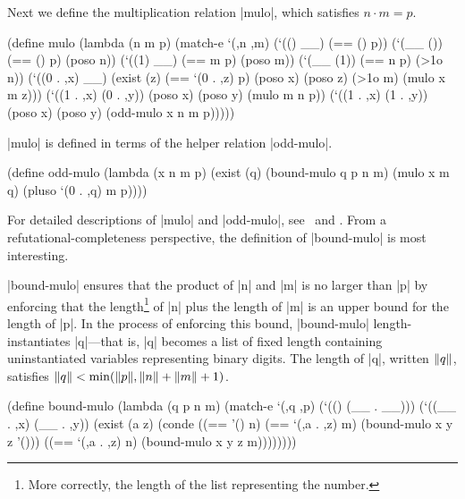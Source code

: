 Next we define the multiplication relation \scheme|mulo|, which
satisfies $n \cdot m = p$.

\schemedisplayspace
\begin{schemedisplay}
(define mulo
  (lambda (n m p)
    (match-e `(,n ,m)
      (`(() __) (== () p))
      (`(__ ()) (== () p) (poso n))  
      (`((1) __) (== m p) (poso m))   
      (`(__ (1)) (== n p) (>1o n))
      (`((0 . ,x) __)
       (exist (z)
         (== `(0 . ,z) p)
         (poso x) (poso z) (>1o m)
         (mulo x m z)))
      (`((1 . ,x) (0 . ,y))
       (poso x) (poso y)
       (mulo m n p))
      (`((1 . ,x) (1 . ,y))
       (poso x) (poso y)
       (odd-mulo x n m p)))))
\end{schemedisplay}

\noindent \scheme|mulo| is defined in terms of the helper relation
\scheme|odd-mulo|.

\schemedisplayspace
\begin{schemedisplay}
(define odd-mulo
  (lambda (x n m p)
    (exist (q)
      (bound-mulo q p n m)
      (mulo x m q)
      (pluso `(0 . ,q) m p))))
\end{schemedisplay}

\noindent For detailed descriptions of \scheme|mulo| and
\scheme|odd-mulo|, see~\cite{trs} and \cite{conf/flops/KiselyovBFS08}.
From a refutational-completeness perspective, the definition of
\scheme|bound-mulo| is most interesting.

\scheme|bound-mulo| ensures that the product of \scheme|n| and
\scheme|m| is no larger than \scheme|p| by enforcing that the
length\footnote{More correctly, the length of the list representing
  the number.}  of \scheme|n| plus the length of \scheme|m| is an
upper bound for the length of \scheme|p|.  In the process of enforcing
this bound, \scheme|bound-mulo| length-instantiates \scheme|q|---that
is, \scheme|q| becomes a list of fixed length containing
uninstantiated variables representing binary digits.  The length of
\scheme|q|, written $\lVert q\rVert$, satisfies $\norm{q} <
\min(\norm{p},\penalty\binoppenalty \norm{n} + \norm{m} + 1)$.

\schemedisplayspace
\begin{schemedisplay}
(define bound-mulo
  (lambda (q p n m)
    (match-e `(,q ,p)
      (`(() (__ . __)))
      (`((__ . ,x) (__ . ,y))
       (exist (a z)
         (conde
           ((== '() n)
            (== `(,a . ,z) m)
            (bound-mulo x y z '()))
           ((== `(,a . ,z) n)
            (bound-mulo x y z m))))))))
\end{schemedisplay}

